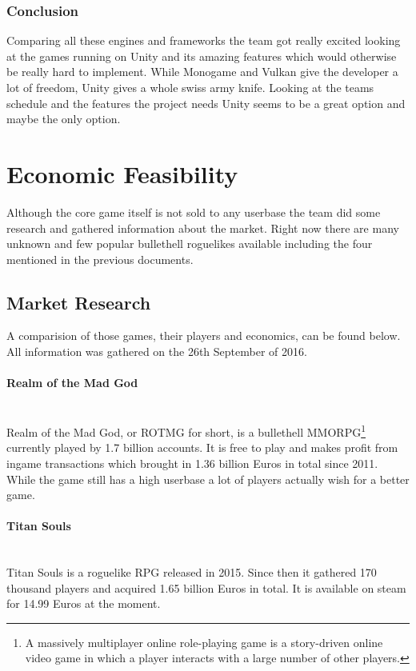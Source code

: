 \documentclass[11pt]{article}
\begin{document}
\subsubsection{Conclusion}
Comparing all these engines and frameworks the team got really excited looking at the games running on Unity and its amazing features which would otherwise be really hard to implement. 
While Monogame and Vulkan give the developer a lot of freedom, Unity gives a whole swiss army knife. Looking at the teams schedule and the features the project needs Unity seems to be a great option and maybe the only option.

\section{Economic Feasibility}
Although the core game itself is not sold to any userbase the team did some research and gathered information about the market.
Right now there are many unknown and few popular bullethell roguelikes available including the four mentioned in the previous documents.

\subsection{Market Research}
A comparision of those games, their players and economics, can be found below. All information was gathered on the 26th September of 2016.

\paragraph{Realm of the Mad God}~\\
Realm of the Mad God, or ROTMG for short, is a bullethell MMORPG\footnote{A massively multiplayer online role-playing game is a story-driven online video game in which a player interacts with a large number of other players.} currently played by 1.7 billion accounts.
It is free to play and makes profit from ingame transactions which brought in 1.36 billion Euros in total since 2011.\\
While the game still has a high userbase a lot of players actually wish for a better game.

\paragraph{Titan Souls}~\\
Titan Souls is a roguelike RPG released in 2015. Since then it gathered 170 thousand players and acquired 1.65 billion Euros in total. It is available on steam for 14.99 Euros at the moment.
\end{document}
